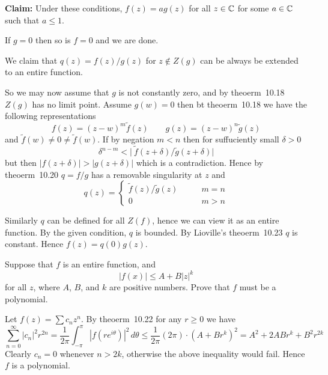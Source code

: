 \begin{enumerate}
\textbf{Claim:}
Under these conditions, \(f(z) = ag(z)\) for all \(z\in\mathbb{C}\) for some
\(a\in\mathbb{C}\) such that \(a\leq 1\).

If \(g = 0\) then so is \(f = 0\) and we are done.

We claim that \(q(z) = f(z)/g(z)\) for \(z\notin Z(g)\)
can be always be extended to an entire function.

So we may now assume that $g$ is not constantly zero, and by theoerm~10.18
\(Z(g)\) has no limit point.
Assume \(g(w) = 0\)
then bt theoerm~10.18 we have the following representations
\begin{equation*}
f(z) = (z-w)^m\tilde{f}(z)
\qquad
g(z) = (z-w)^n\tilde{g}(z)
\end{equation*}
and \(\tilde{f}(w) \neq 0 \neq \tilde{f}(w)\).
If by negation \(m < n\) then for suffuciently small \(\delta>0\)
\begin{equation*}
\delta^{n-m} < \bigl|\ \tilde{f}(z+\delta) / \tilde{g}(z+\delta)\bigr|
\end{equation*}
but then \(|f(z+\delta)| > |g(z+\delta)|\) which is a contradiction.
Hence by theoerm~10.20 \(q=f/g\) has a removable singularity at $z$
and
\begin{equation*}
q(z) = \left\{\begin{array}{ll}
\tilde{f}(z)/\tilde{g}(z) \qquad& m=n \\
0 & m > n
\end{array}\right.
\end{equation*}

Similarly $q$ can be defined for all \(Z(f)\),
hence we can view it as an entire function. By the given condition,
$q$ is bounded. By
Lioville's theoerm~10.23 $q$ is constant. Hence \(f(z)= q(0) g(z)\).


\begin{excopy}
Suppose that $f$ is an entire function, and
\begin{equation*}
|f(x)| \leq A + B|z|^k
\end{equation*}
for all $z$, where $A$, $B$, and $k$ are positive numbers.
Prove that $f$ must be a polynomial.
\end{excopy}

Let \(f(z) = \sum c_nz^n\). By
theoerm~10.22 for any \(r\geq 0\) we have
\begin{equation*}
\sum_{n=0}^\infty |c_n|^2 r^{2n}
= \frac{1}{2\pi}\int_{-\pi}^\pi \left| f(re^{i\theta})\right|^2\,d\theta
\leq \frac{1}{2\pi} (2\pi)\cdot(A+Br^k)^2
= A^2+2ABr^k + B^2r^{2k}
\end{equation*}
Clearly \(c_n = 0\) whenever \(n > 2k\), otherwise the above inequality
would fail. Hence $f$ is a polynomial.


\end{enumerate}
